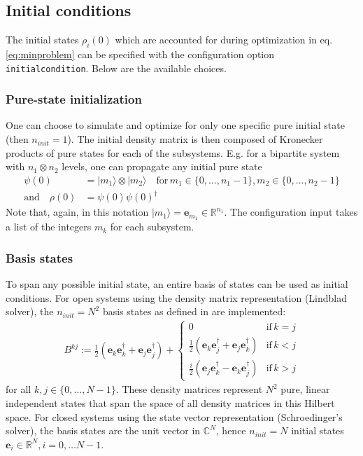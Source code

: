 \documentclass[11pt]{article}
\newcommand{\R}{\mathds{R}}
\newcommand{\C}{\mathds{C}}
\newcommand{\bs}[1]{{\boldsymbol{#1}}}
\begin{document}
\subsection{Initial conditions}\label{subsec:initcond}
The initial states $\rho_i(0)$ which are accounted for during optimization in eq. \eqref{eq:minproblem} can be specified with the configuration option \texttt{initialcondition}. Below are the available choices. 

\subsubsection{Pure-state initialization}
One can choose to simulate and optimize for only one specific pure initial state (then $n_{init} = 1$). The initial density matrix is then composed of Kronecker products of pure states for each of the subsystems. E.g. for a bipartite system with $n_1
\otimes n_2$ levels, one can propagate any initial pure state 
\begin{align}
  \psi(0) &= |m_1\rangle \otimes |m_2\rangle \quad \text{for} \, m_1 \in \{0,\dots, n_1-1\}, m_2\in \{0,\dots, n_2-1\}\\
   \text{and} \quad \rho(0) &= \psi(0)\psi(0)^\dagger 
\end{align}
Note that, again, in this notation $|m_1\rangle = \boldsymbol{e}_{m_1} \in \R^{n_1}$. The configuration input takes a list of the integers $m_k$ for each subsystem. 

\subsubsection{Basis states}


To span any possible initial state, an entire basis of states can be used as initial conditions. For open systems using the density matrix representation (Lindblad solver), the $n_{init}=N^2$ basis states as defined in \cite{guenther2021quantum} are implemented:
\begin{align}\label{eq:basismats}
B^{kj} := \frac 12 \left(\bs{e}_k\bs{e}_k^\dagger + \bs{e}_j\bs{e}_j^\dagger\right) +  \begin{cases} 
          0 & \text{if} \, k=j \\ 
        \frac 12 \left( \bs{e}_k\bs{e}_j^\dagger  + \bs{e}_j\bs{e}_k^\dagger \right) & \text{if} \, k<j \\
        \frac i2 \left( \bs{e}_j\bs{e}_k^\dagger  - \bs{e}_k\bs{e}_j^\dagger \right) & \text{if} \, k>j
      \end{cases} 
\end{align}
for all $k,j\in\{0,\dots, N-1\}$.
These density matrices represent $N^2$ pure, linear independent states that span the space of all density matrices in this Hilbert space. For closed systems using the state vector representation (Schroedinger's solver), the basis states are the unit vector in $\C^{N}$, hence $n_{init} = N$ initial states $\boldsymbol{e}_i \in \R^N, i=0,\dots N-1$. 
\end{document}
